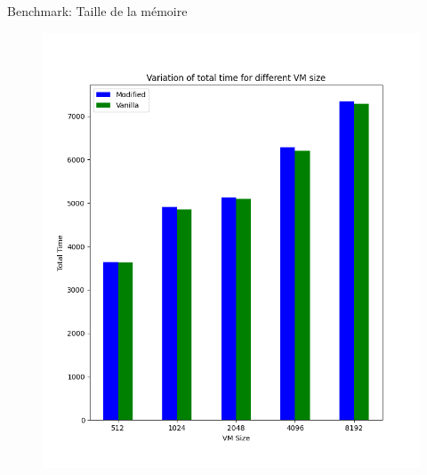 \documentclass{libs/XJTLU_format}
\begin{document}
\begin{frame}{Benchmark: Taille de la mémoire}
{\begin{figure}[H]
\begin{minipage}{0.48\textwidth}
            \end{minipage}\hfill
            \begin{minipage}{0.48\textwidth}
                \centering
                \includegraphics[width=1\linewidth]{images/total_vmsize.png}
            \end{minipage}
        \end{figure}
    }
\end{frame}
\end{document}
